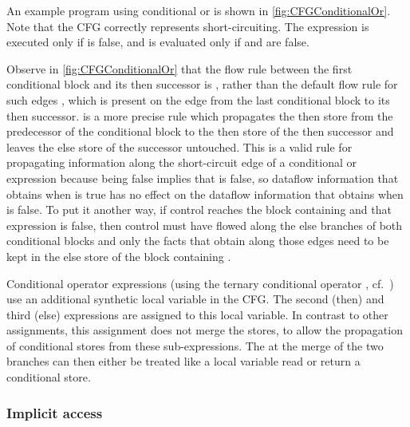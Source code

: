 An example program using conditional or is shown in
\autoref{fig:CFGConditionalOr}.  Note that the CFG correctly
represents short-circuiting.  The expression  is
executed only if  is false, and  is evaluated only if
 and  are false.

Observe in \autoref{fig:CFGConditionalOr} that the flow rule between
the first conditional block and its then successor is
, rather than the default flow rule for such edges
, which is present on the edge from the last
conditional block to its then successor.   is a
more precise rule which propagates the then store from the predecessor
of the conditional block to the then store of the then successor and
leaves the else store of the successor untouched.  This is a valid
rule for propagating information along the short-circuit edge of a
conditional or expression because  being false
implies that  is false, so dataflow information that obtains
when  is true has no effect on the dataflow information that
obtains when  is false.  To put it another way,
if control reaches the block containing  and
that expression is false, then control must have flowed along the else
branches of both conditional blocks and only the facts that obtain
along those edges need to be kept in the else store of the block
containing .


Conditional operator expressions (using the ternary conditional operator
, cf.\ ) use an additional synthetic local
variable in the CFG. The second (then) and third (else) expressions are
assigned to this local variable. In contrast to other assignments, this
assignment does not merge the stores, to allow the propagation of
conditional stores from these sub-expressions.
The  at the merge of the two branches can
then either be treated like a local variable read or return a
conditional store.



\subsubsection{Implicit  access}

